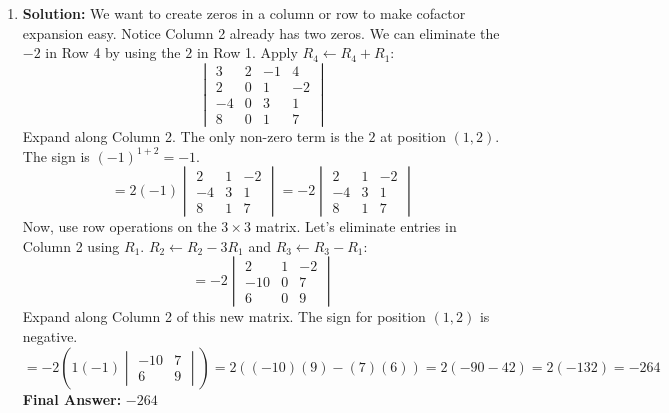 \documentclass[11pt]{article}
\begin{document}
\begin{enumerate}
    \item \textbf{Solution:} We want to create zeros in a column or row to make cofactor expansion easy. Notice Column 2 already has two zeros. We can eliminate the $-2$ in Row 4 by using the $2$ in Row 1.
    Apply $R_4 \leftarrow R_4 + R_1$:
    \[ \begin{vmatrix} 3 & 2 & -1 & 4 \\ 2 & 0 & 1 & -2 \\ -4 & 0 & 3 & 1 \\ 8 & 0 & 1 & 7 \end{vmatrix} \]
    Expand along Column 2. The only non-zero term is the $2$ at position $(1,2)$. The sign is $(-1)^{1+2} = -1$.
    \[ = 2(-1) \begin{vmatrix} 2 & 1 & -2 \\ -4 & 3 & 1 \\ 8 & 1 & 7 \end{vmatrix} = -2 \begin{vmatrix} 2 & 1 & -2 \\ -4 & 3 & 1 \\ 8 & 1 & 7 \end{vmatrix} \]
    Now, use row operations on the $3 \times 3$ matrix. Let's eliminate entries in Column 2 using $R_1$.
    $R_2 \leftarrow R_2 - 3R_1$ and $R_3 \leftarrow R_3 - R_1$:
    \[ = -2 \begin{vmatrix} 2 & 1 & -2 \\ -10 & 0 & 7 \\ 6 & 0 & 9 \end{vmatrix} \]
    Expand along Column 2 of this new matrix. The sign for position $(1,2)$ is negative.
    \[ = -2 \left( 1(-1) \begin{vmatrix} -10 & 7 \\ 6 & 9 \end{vmatrix} \right) = 2 ((-10)(9) - (7)(6)) = 2(-90 - 42) = 2(-132) = -264 \]
    \textbf{Final Answer:} $-264$


\end{enumerate}
\end{document}
